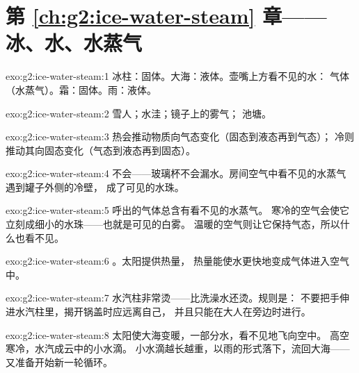 \section*{第 \ref{ch:g2:ice-water-steam} 章——冰、水、水蒸气}

\begin{solution}{exo:g2:ice-water-steam:1}
冰柱：固体。大海：液体。壶嘴上方看不见的水：
气体（水蒸气）。霜：固体。雨：液体。
\end{solution}

\begin{solution}{exo:g2:ice-water-steam:2}
雪人；水洼；镜子上的雾气；
池塘。
\end{solution}

\begin{solution}{exo:g2:ice-water-steam:3}
热会推动物质向气态变化（固态到液态再到气态）；
冷则推动其向固态变化（气态到液态再到固态）。
\end{solution}

\begin{solution}{exo:g2:ice-water-steam:4}
不会——玻璃杯不会漏水。房间空气中看不见的水蒸气
遇到罐子外侧的冷壁，
成了可见的水珠。
\end{solution}

\begin{solution}{exo:g2:ice-water-steam:5}
呼出的气体总含有看不见的水蒸气。
寒冷的空气会使它立刻成细小的水珠——也就是可见的白雾。
温暖的空气则让它保持气态，所以什么也看不见。
\end{solution}

\begin{solution}{exo:g2:ice-water-steam:6}
。太阳提供热量，
热量能使水更快地变成气体进入空气中。
\end{solution}

\begin{solution}{exo:g2:ice-water-steam:7}
水汽柱非常烫——比洗澡水还烫。规则是：
不要把手伸进水汽柱里，揭开锅盖时应远离自己，
并且只能在大人在旁边时进行。
\end{solution}

\begin{solution}{exo:g2:ice-water-steam:8}
太阳使大海变暖，一部分水，看不见地飞向空中。
高空寒冷，水汽成云中的小水滴。
小水滴越长越重，以雨的形式落下，流回大海——
又准备开始新一轮循环。
\end{solution}

